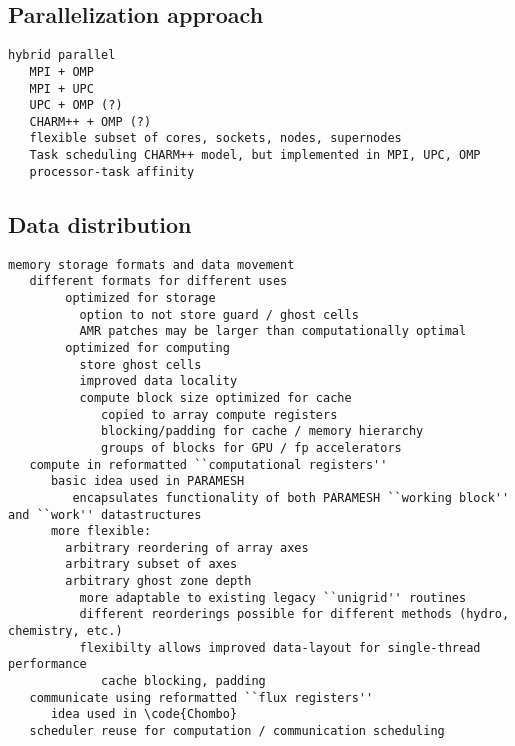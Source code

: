 \documentclass[14pt,letter]{article}
\begin{document}
\subsection{Parallelization approach}

\begin{verbatim}
hybrid parallel
   MPI + OMP
   MPI + UPC
   UPC + OMP (?)
   CHARM++ + OMP (?)
   flexible subset of cores, sockets, nodes, supernodes
   Task scheduling CHARM++ model, but implemented in MPI, UPC, OMP
   processor-task affinity
\end{verbatim}

\subsection{Data distribution} \label{ss:data-placement}

\begin{verbatim}
memory storage formats and data movement
   different formats for different uses
        optimized for storage
          option to not store guard / ghost cells
          AMR patches may be larger than computationally optimal
        optimized for computing
          store ghost cells
          improved data locality
          compute block size optimized for cache
             copied to array compute registers
             blocking/padding for cache / memory hierarchy
             groups of blocks for GPU / fp accelerators
   compute in reformatted ``computational registers''
      basic idea used in PARAMESH
         encapsulates functionality of both PARAMESH ``working block'' and ``work'' datastructures
      more flexible:
        arbitrary reordering of array axes
        arbitrary subset of axes
        arbitrary ghost zone depth
          more adaptable to existing legacy ``unigrid'' routines
          different reorderings possible for different methods (hydro, chemistry, etc.)
          flexibilty allows improved data-layout for single-thread performance
             cache blocking, padding
   communicate using reformatted ``flux registers''
      idea used in \code{Chombo}
   scheduler reuse for computation / communication scheduling
\end{verbatim}

\end{document}
